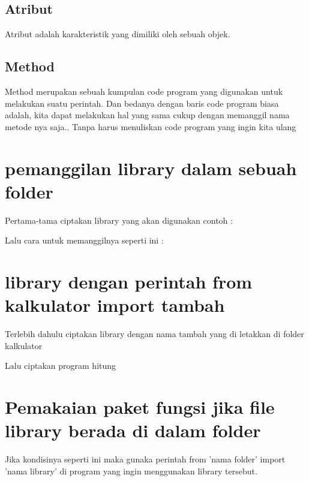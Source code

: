 \documentclass[12pt, times new roman]{report}
\begin{document}
\subsection{Atribut}
\hspace{1cm} Atribut adalah karakteristik yang dimiliki oleh sebuah objek.


\subsection{Method}
\hspace{1cm} Method merupakan sebuah kumpulan code program yang digunakan untuk melakukan suatu perintah. Dan bedanya dengan baris code program biasa adalah, kita dapat melakukan hal yang sama cukup dengan  memanggil nama metode nya saja.. Tanpa harus menuliskan code program yang ingin kita ulang


\section{ pemanggilan library dalam sebuah folder}
\hspace{1cm} Pertama-tama ciptakan library yang akan digunakan contoh :



\hspace{0.5cm} Lalu cara untuk memanggilnya seperti ini :



\section{library dengan perintah from kalkulator import tambah}
\hspace{1cm} Terlebih dahulu ciptakan library dengan nama tambah yang di letakkan di folder kalkulator



\hspace{0.5cm} Lalu ciptakan program hitung 



\section{Pemakaian paket fungsi jika file library berada di dalam folder}
\hspace{1cm} Jika kondisinya seperti ini maka gunaka perintah from 'nama folder' import 'nama library' di program yang ingin menggunakan library tersebut.
\end{document}
